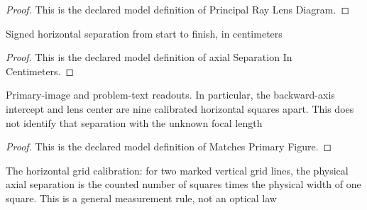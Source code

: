 \begin{proof}
  This is the declared model definition of Principal Ray Lens Diagram.
\end{proof}
\begin{definition}
  \label{def:physics:phyx-mini-0109:phyxminiproblems-problemphyxmini0109-axialseparationincentimeters}
  Signed horizontal separation from start to finish, in centimeters
\end{definition}
\begin{proof}
  This is the declared model definition of axial Separation In Centimeters.
\end{proof}
\begin{definition}
  \label{def:physics:phyx-mini-0109:phyxminiproblems-problemphyxmini0109-matchesprimaryfigure}
  Primary-image and problem-text readouts. In particular, the backward-axis intercept and lens center are nine calibrated horizontal squares apart. This does not identify that separation with the unknown focal length
\end{definition}
\begin{proof}
  This is the declared model definition of Matches Primary Figure.
\end{proof}
\begin{definition}
  \label{def:physics:phyx-mini-0109:phyxminiproblems-problemphyxmini0109-hascalibratedhorizontalgrid}
  The horizontal grid calibration: for two marked vertical grid lines, the physical axial separation is the counted number of squares times the physical width of one square. This is a general measurement rule, not an optical law
\end{definition}
